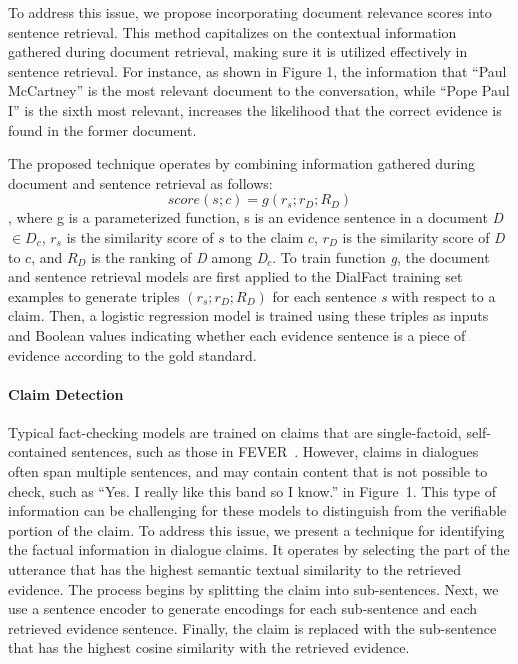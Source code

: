 To address this issue, we propose incorporating document relevance scores into sentence retrieval. This method capitalizes on the contextual information gathered during document retrieval, making sure it is utilized effectively in sentence retrieval. For instance, as shown in Figure 1, the information that ``Paul McCartney'' is the most relevant document to the conversation, while ``Pope Paul I'' is the sixth most relevant, increases the likelihood that the correct evidence is found in the former document. 

The proposed technique operates by combining information gathered during document and sentence retrieval as follows:
\begin{equation}
    score(s;c) = g(r_s; r_D; R_D)
\end{equation}
, where g is a parameterized function, s is an evidence sentence in a document \textit{D} $\in D_c$, $r_s$ is the similarity score of $s$ to the claim $c$, $r_D$ is the similarity score of \textit{D} to $c$, and $R_D$ is the ranking of \textit{D} among \textit{D$_c$}.  To train function \textit{g}, the document and sentence retrieval models are first applied to the DialFact training set examples to generate triples $(r_s; r_D; R_D)$ for each sentence \textit{s} with respect to a claim. Then, a logistic regression model is trained using these triples as inputs and Boolean values indicating whether each evidence sentence is a piece of evidence according to the gold standard.

\paragraph{Claim Detection} Typical fact-checking models are trained on claims that are single-factoid, self-contained sentences, such as those in FEVER~\cite{fever}. However, claims in dialogues often span multiple sentences, and may contain content that is not possible to check, such as ``Yes. I really like this band so I know.'' in Figure~1. This type of information can be challenging for these models to distinguish from the verifiable portion of the claim. 
%
To address this issue, we present a technique for identifying the factual information in dialogue claims. It operates by selecting the part of the utterance that has the highest semantic textual similarity to the retrieved evidence. The process begins by splitting the claim into sub-sentences. Next, we use a sentence encoder to generate encodings for each sub-sentence and each retrieved evidence sentence. Finally, the claim is replaced with the sub-sentence that has the highest cosine similarity with the retrieved evidence.